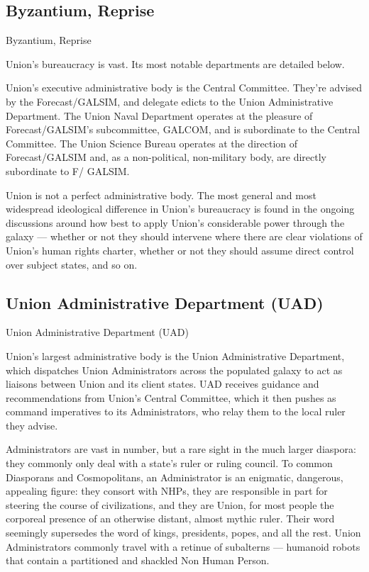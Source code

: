                                                                                                             

\subsection{Byzantium, Reprise }
   

Byzantium, Reprise  

Union’s bureaucracy is vast. Its most notable departments are detailed below. 
 

Union’s executive administrative body is the Central Committee. They’re advised by the  
Forecast/GALSIM, and delegate edicts to the Union Administrative Department. The Union Naval  
Department operates at the pleasure of Forecast/GALSIM’s subcommittee, GALCOM, and is  
subordinate to the Central Committee. The Union Science Bureau operates at the direction of  
Forecast/GALSIM and, as a non-political, non-military body, are directly subordinate to F/ 
GALSIM. 
 

Union is not a perfect administrative body. The most general and most widespread ideological  
difference in Union’s bureaucracy is found in the ongoing discussions around how best to apply  
Union’s considerable power through the galaxy — whether or not they should intervene where  
there are clear violations of Union’s human rights charter, whether or not they should assume  
direct control over subject states, and so on. 
 
 
\subsection{Union Administrative Department (UAD)}

Union Administrative Department (UAD)  

Union’s largest administrative body is the Union Administrative Department, which dispatches  
Union Administrators across the populated galaxy to act as liaisons between Union and its client  
states. UAD receives guidance and recommendations from Union’s Central Committee, which it  
then pushes as command imperatives to its Administrators, who relay them to the local ruler they  
advise. 
 

Administrators are vast in number, but a rare sight in the much larger diaspora: they commonly  
only deal with a state’s ruler or ruling council. To common Diasporans and Cosmopolitans, an  
Administrator is an enigmatic, dangerous, appealing figure: they consort with NHPs, they are  
responsible in part for steering the course of civilizations, and they are Union, for most people  
the corporeal presence of an otherwise distant, almost mythic ruler. Their word seemingly  
supersedes the word of kings, presidents, popes, and all the rest. Union Administrators  
commonly travel with a retinue of subalterns — humanoid robots that contain a partitioned and  
shackled Non Human Person. 
 

